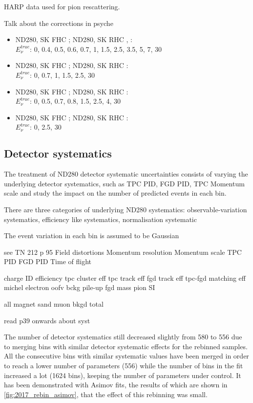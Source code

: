 HARP data used for pion rescattering.

Talk about the corrections in psyche
\begin{itemize}
  \item ND280, SK FHC \numu; ND280, SK RHC \numubar, :\\
    $E_\nu^{true}$: 0, 0.4, 0.5, 0.6, 0.7, 1, 1.5, 2.5, 3.5, 5, 7, 30

  \item ND280, SK FHC \numubar; ND280, SK RHC \numu:\\
    $E_\nu^{true}$: 0, 0.7, 1, 1.5, 2.5, 30

  \item ND280, SK FHC \nue; ND280, SK RHC \nuebar:\\
    $E_\nu^{true}$: 0, 0.5, 0.7, 0.8, 1.5, 2.5, 4, 30

  \item ND280, SK FHC \nuebar; ND280, SK RHC \nue:\\
    $E_\nu^{true}$: 0, 2.5, 30
\end{itemize}

\subsection{Detector systematics}
\label{subsec:syst_nd280}
The treatment of ND280 detector systematic uncertainties consists of varying the underlying detector systematics, such as TPC PID, FGD PID, TPC Momentum scale and study the impact on the number of predicted events in each \pmu \cosmu bin. 

There are three categories of underlying ND280 systematics: observable-variation systematics, efficiency like systematics, normalisation systematic

The event variation in each \pmu \cosmu bin is assumed to be Gaussian  

see TN 212 p 95
Field distortions
Momentum resolution
Momentum scale
TPC PID
FGD PID
Time of flight

charge ID efficiency
tpc cluster eff
tpc track eff
fgd track eff
tpc-fgd matching eff
michel electron
oofv bckg
pile-up
fgd mass
pion SI

all magnet
sand muon bkgd
total

read p39 onwards about syst

The number of detector systematics still decreased slightly from 580 to 556 due to merging bins with similar detector systematic effects for the rebinned samples.
All the consecutive bins with similar systematic values have been merged in order to reach a lower number of parameters (556) while the number of bins in the fit increased a lot (1624 bins), keeping the number of parameters under control.
It has been demonstrated with Asimov fits, the results of which are shown in \autoref{fig:2017_rebin_asimov}, that the effect of this rebinning was small.

